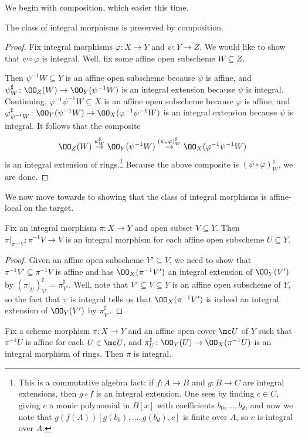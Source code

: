 \documentclass[../notes.tex]{subfiles}
\begin{document}
We begin with composition, which easier this time.
\begin{lemma}
	The class of integral morphisms is preserved by composition.
\end{lemma}
\begin{proof}
	Fix integral morphisms $\varphi\colon X\to Y$ and $\psi\colon Y\to Z$. We would like to show that $\psi\circ\varphi$ is integral. Well, fix some affine open subscheme $W\subseteq Z$.
	
	Then $\psi^{-1}W\subseteq Y$ is an affine open subscheme because $\psi$ is affine, and $\psi^\sharp_W\colon\OO_Z(W)\to\OO_Y(\psi^{-1}W)$ is an integral extension because $\psi$ is integral. Continuing, $\varphi^{-1}\psi^{-1}W\subseteq X$ is an affine open subscheme because $\varphi$ is affine, and $\varphi^\sharp_{\psi^{-1}W}\colon\OO_Y(\psi^{-1}W)\to\OO_X(\varphi^{-1}\psi^{-1}W)$ is an integral extension because $\psi$ is integral. It follows that the composite
	\[\OO_Z(W)\stackrel{\psi^\sharp_W}\to\OO_Y(\psi^{-1}W)\stackrel{(\psi_*\varphi)^\sharp_W}\to\OO_X(\varphi^{-1}\psi^{-1}W)\]
	is an integral extension of rings.\footnote{This is a commutative algebra fact: if $f\colon A\to B$ and $g\colon B\to C$ are integral extensions, then $g\circ f$ is an integral extension. One sees by finding $c\in C$, giving $c$ a monic polynomial in $B[x]$ with coefficients $b_0,\ldots,b_d$, and now we note that $g(f(A))[g(b_0),\ldots,g(b_d),c]$ is finite over $A$, so $c$ is integral over $A$.} Because the above composite is $(\psi\circ\varphi)^\sharp_W$, we are done.
\end{proof}
We now move towards to showing that the class of integral morphisms is affine-local on the target.
\begin{lemma} \label{lem:restrict-integral}
	Fix an integral morphism $\pi\colon X\to Y$ and open subset $V\subseteq Y$. Then $\pi|_{\pi^{-1}V}\colon\pi^{-1}V\to V$ is an integral morphism for each affine open subscheme $U\subseteq Y$.
\end{lemma}
\begin{proof}
	Given an affine open subscheme $V'\subseteq V$, we need to show that $\pi^{-1}V'\subseteq\pi^{-1}V$ is affine and has $\OO_X(\pi^{-1}V')$ an integral extension of $\OO_Y(V')$ by $(\pi|_{U})^\sharp_{V'}=\pi^\sharp_{V'}$. Well, note that $V'\subseteq V\subseteq Y$ is an affine open subscheme of $Y$, so the fact that $\pi$ is integral tells us that $\OO_X(\pi^{-1}V')$ is indeed an integral extension of $\OO_Y(V')$ by $\pi^\sharp_{V'}$.
\end{proof}
\begin{lemma} \label{lem:almost-integral-affine-local-target}
	Fix a scheme morphism $\pi\colon X\to Y$ and an affine open cover $\mc U$ of $Y$ such that $\pi^{-1}U$ is affine for each $U\in\mc U$, and $\pi^\sharp_U\colon\OO_Y(U)\to\OO_X(\pi^{-1}U)$ is an integral morphism of rings. Then $\pi$ is integral.
\end{lemma}
\end{document}
